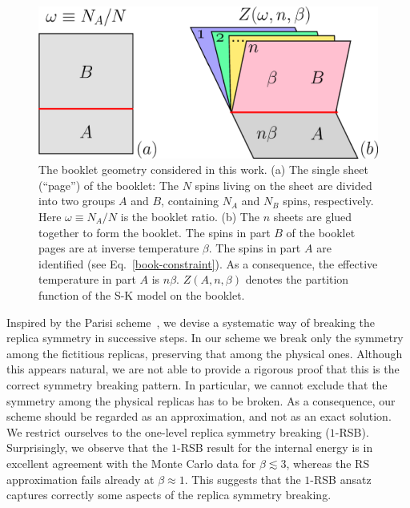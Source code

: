 \documentclass[twocolumn,superscriptaddress,prb,10pt]{revtex4-1}
\begin{document}
\begin{figure}[t]
\includegraphics*[width=0.93\linewidth]{./draft_figs/cartoon}
\caption{ The booklet geometry considered in this work. (a) The single sheet 
 (``page'') of the booklet: The $N$ spins living on the sheet are divided into 
 two groups $A$ and $B$, containing $N_A$ and $N_B$ spins, respectively. Here 
 $\omega\equiv N_A/N$ is the booklet ratio. (b) The $n$ sheets are glued together 
 to form the booklet. The spins in part $B$ of the booklet pages are at inverse 
 temperature $\beta$. The spins in part $A$ are identified  (see Eq.~\eqref{book-constraint}). 
 As a consequence, the effective temperature in part $A$ is $n\beta$. 
 $Z(A,n,\beta)$ denotes the partition function of the S-K model on 
 the booklet. 
}
\label{cartoon}
\end{figure}

Inspired by the Parisi scheme~\cite{parisi-1979}, we devise a systematic way of breaking 
the replica symmetry in successive steps. In our scheme we break only the symmetry among 
the fictitious replicas, preserving that among the physical ones. Although this appears 
natural, we are not able to provide a rigorous proof that this is the correct symmetry 
breaking pattern. In particular, we cannot exclude that the symmetry among the physical 
replicas has to be broken. As a consequence, our scheme should be regarded as an 
approximation, and not as an exact solution. We restrict ourselves to the 
one-level replica symmetry breaking ($1$-RSB). 
Surprisingly, we observe that the $1$-RSB result for the internal energy is in 
excellent agreement with the Monte Carlo data for  $\beta\lesssim 3$, whereas the RS 
approximation fails already at $\beta\approx 1$. This suggests that the $1$-RSB ansatz 
captures correctly some aspects of the replica symmetry breaking. 
\end{document}
